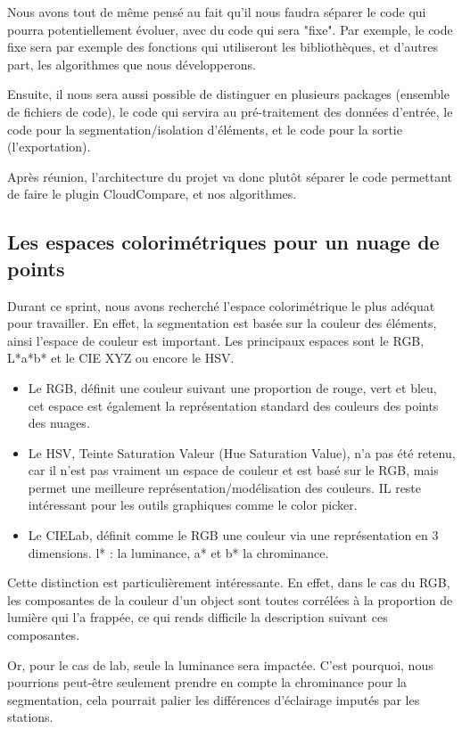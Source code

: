 \documentclass[12pt,titlepage,french]{article}
\begin{document}
Nous avons tout de même pensé au fait qu'il nous faudra séparer le code qui pourra potentiellement évoluer, avec du code qui sera "fixe". Par exemple, le code fixe sera par exemple des fonctions qui utiliseront les bibliothèques, et d'autres part, les algorithmes que nous développerons.

Ensuite, il nous sera aussi possible de distinguer en plusieurs packages (ensemble de fichiers de code), le code qui servira au pré-traitement des données d'entrée, le code pour la segmentation/isolation d'éléments, et le code pour la sortie (l'exportation).

Après réunion, l'architecture du projet va donc plutôt séparer le code permettant de faire le plugin CloudCompare, et nos algorithmes.

\subsection{Les espaces colorimétriques pour un nuage de points}

Durant ce sprint, nous avons recherché l'espace colorimétrique le plus adéquat pour travailler.
En effet, la segmentation est basée sur la couleur des éléments, ainsi l'espace de couleur est important.
Les principaux espaces sont le RGB, L*a*b* et le CIE XYZ ou encore le HSV.
\begin{itemize}
    \item Le RGB, définit une couleur suivant une proportion de rouge, vert et bleu, cet espace est également la représentation standard des couleurs des points des nuages.
    \item Le HSV, Teinte Saturation Valeur (Hue Saturation Value), n'a pas été retenu, car il n'est pas vraiment un espace de couleur et est basé sur le RGB, mais permet une meilleure représentation/modélisation des couleurs.
IL reste intéressant pour les outils graphiques comme le color picker.
    \item Le CIELab, définit comme le RGB une couleur via une représentation en 3 dimensions. l* : la luminance, a* et b* la chrominance.
\end{itemize}
Cette distinction est particulièrement intéressante. En effet, dans le cas du RGB, les composantes de la couleur d'un object sont toutes corrélées à la proportion de lumière qui l'a frappée, ce qui rends difficile la description suivant ces composantes.

Or, pour le cas de lab, seule la luminance sera impactée. C'est pourquoi, nous pourrions peut-être seulement prendre en compte la chrominance pour la segmentation, cela pourrait palier les différences d'éclairage imputés par les stations.
\end{document}
